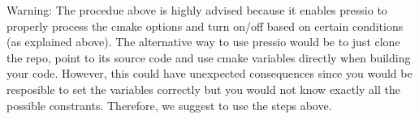 \begin{DoxyParagraph}{Warning\+:}
The procedue above is highly advised because it enables {\ttfamily pressio} to properly process the cmake options and turn on/off based on certain conditions (as explained above). The alternative way to use pressio would be to just clone the repo, point to its source code and use cmake variables directly when building your code. However, this could have unexpected consequences since you would be resposible to set the variables correctly but you would not know exactly all the possible constrants. Therefore, we suggest to use the steps above. 
\end{DoxyParagraph}
